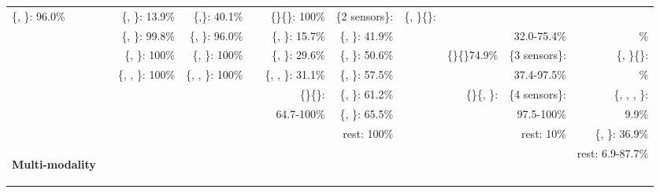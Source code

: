 \begin{table*}[t]
{\begin{tabular}{@{}l c rr c rr c rrr@{}}
\{\audio{}, \bluetooth{}\}: 96.0\%    && 
\{\gas{}, \temperature{}\}: 13.9\%    & 
\{\gas{},\temperature{}\}: 40.1\%     && 
\colorbox{gray!70}{\{\bluetooth{}\}\{\}: 100\%}             & 
\{2 sensors\}:                      & 
\{\audio{}, \bluetooth{}\}\{\}: \\
&& 
\{\bluetooth{}, \wifi{}\}: 99.8\%     & 
\{\audio{}, \wifi{}\}: 96.0\%         && 
\{\gas{}, \humidity{}\}: 15.7\%       &  
\{\humidity{}, \temperature{}\}: 41.9\% && 
                                      & 
32.0-75.4\%                          & 
\% \\
&& 
\{\audio{}, \wifi{}\}: 100\%          & 
\{\bluetooth{}, \wifi{}\}: 100\%      && 
\{\humidity{}, \temperature{}\}: 29.6\% &  
\{\altitude{}, \temperature{}\}: 50.6\% && 
\{\audio{}\}\{\}74.9\%  & 
\{3 sensors\}:                      &
\{\audio{}, \wifi{}\}\{\}: \\
&& 
\{\audio{}, \bluetooth{}, \wifi{}\}: 100\%      &
\{\audio{}, \bluetooth{}, \wifi{}\}: 100\%      && 
\{\gas{}, \humidity{}, \temperature{}\}: 31.1\%   & 
\{\gas{}, \humidity{}\}: 57.5\%               && 
                                               & 
37.4-97.5\%                                    & 
\% \\
&&                              
&                               
&&
\{\altitude{}\}\{\}: & 
\{\altitude{}, \humidity{}\}: 61.2\%          && 
\{\}\{\audio{}, \bluetooth{}\}:      &
\{4 sensors\}:                              &
\{\altitude{}, \gas{}, \humidity{}, \temperature{}\}:\\


&&                              
&
&& 
64.7-100\%&  
\{\altitude{}, \gas{}\}: 65.5\%               && 
                                       & 
97.5-100\%                                   & 
9.9\% \\


&&                              
&
&& 
&
rest: 100\%     &&                    
                &             
rest: 10\%      & 
\colorbox{gray!70}{\{\bluetooth{}, \wifi{}\}: 36.9\%} \\


\multirow{-4}{*}{\begin{rotate}{90} {\bf Multi-modality}\end{rotate}}&&
&                
&&                             
&                          
&&                    
&                  
&
rest: 6.9-87.7\% \\
\bottomrule
\end{tabular}
}
\end{table*}
 


